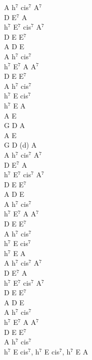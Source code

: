 \documentclass[a5paper, 10pt]{book}
\begin{document}
\begin{minipage}[t]{0.35\textwidth}
A h$^7$ cis$^7$ A$^7$\\
D E$^7$ A\\
h$^7$ E$^7$ cis$^7$ A$^7$\\
D E E$^7$\\
A D E\\
A h$^7$ cis$^7$\\
h$^7$ E$^7$ A A$^7$\\
D E E$^7$\\
A h$^7$ cis$^7$\\
h$^7$ E cis$^7$ \\
h$^7$ E A\\

A E \\
G D A\\
A E \\
G D (d) A\\

A h$^7$ cis$^7$ A$^7$\\
D E$^7$ A\\
h$^7$ E$^7$ cis$^7$ A$^7$\\
D E E$^7$\\
A D E\\
A h$^7$ cis$^7$\\
h$^7$ E$^7$ A A$^7$\\
D E E$^7$\\
A h$^7$ cis$^7$\\
h$^7$ E cis$^7$ \\
h$^7$ E A\\

A h$^7$ cis$^7$ A$^7$\\
D E$^7$ A\\
h$^7$ E$^7$ cis$^7$ A$^7$\\
D E E$^7$\\
A D E\\
A h$^7$ cis$^7$\\
h$^7$ E$^7$ A A$^7$\\
D E E$^7$\\
A h$^7$ cis$^7$\\
h$^7$ E cis$^7$, h$^7$ E cis$^7$, h$^7$ E A\\
\end{minipage}

\newpage
\end{document}
